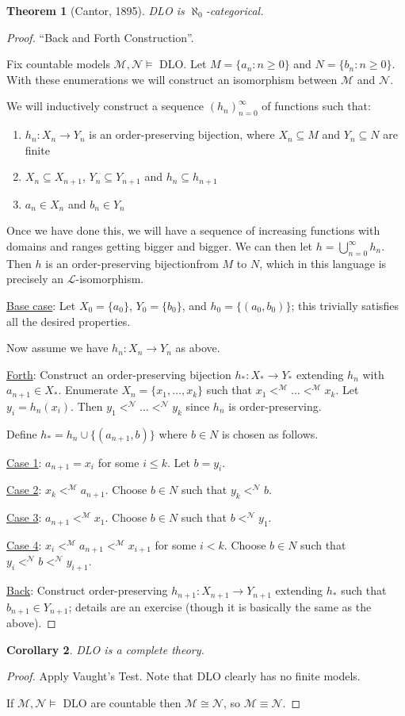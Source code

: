 \documentclass[]{article}
\theoremstyle{custhm}
\newtheorem{theorem}{Theorem}[section]
\theoremstyle{cusdef}
\theoremstyle{custhm}
\theoremstyle{custhm}
\newtheorem{cor}[theorem]{Corollary}
\theoremstyle{custhm}
\theoremstyle{ex}
\theoremstyle{custhm}
\theoremstyle{cusdef}
\theoremstyle{remark}
\theoremstyle{remark}
\newcommand{\ra}{\rightarrow}
\renewcommand{\L}{\mathcal{L}}
\newcommand{\M}{\mathcal{M}}
\newcommand{\N}{\mathcal{N}}
\renewcommand{\subset}{\subseteq}
\begin{document}
\begin{theorem}[Cantor, 1895]
DLO is $\aleph_0$-categorical.
\end{theorem}
\begin{proof}
``Back and Forth Construction''.

Fix countable models $\M,\N\models$ DLO. Let $M = \{a_n:n\ge 0\}$ and $N = \{b_n:n\ge 0\}$. With these enumerations we will construct an isomorphism between $\M$ and $\N$.

We will inductively construct a sequence $(h_n)_{n=0}^{\infty}$ of functions such that:
\begin{enumerate}[label=\arabic*)]
	\item $h_n:X_n\ra Y_n$ is an order-preserving bijection, where $X_n\subset M$ and $Y_n\subset N$ are finite
	\item $X_n\subset X_{n+1}$, $Y_n\subset Y_{n+1}$ and $h_n\subset h_{n+1}$
	\item $a_n \in X_n$ and $b_n \in Y_n$
\end{enumerate}
Once we have done this, we will have a sequence of increasing functions with domains and ranges getting bigger and bigger. We can then let $h = \bigcup_{n=0}^{\infty}h_n$. Then $h$ is an order-preserving bijectionfrom $M$ to $N$, which in this language is precisely an $\L$-isomorphism.

\underline{Base case}: Let $X_0 = \{a_0\}$, $Y_0 = \{b_0\}$, and $h_0 = \{(a_0,b_0)\}$; this trivially satisfies all the desired properties.

Now assume we have $h_n:X_n\ra Y_n$ as above.

\underline{Forth}: Construct an order-preserving bijection $h_\ast:X_\ast\ra Y_\ast$ extending $h_n$ with $a_{n+1}\in X_\ast$. Enumerate $X_n = \{x_1,\dots,x_k\}$ such that $x_1 <^\M \dots <^\M x_k$. Let $y_i = h_n(x_i)$. Then $y_1 <^\N \dots <^\N y_k$ since $h_n$ is order-preserving.

Define $h_\ast = h_n \cup \{(a_{n+1},b)\}$ where $b\in N$ is chosen as follows.

\underline{Case 1}: $a_{n+1} = x_i$ for some $i\le k$. Let $b = y_i$.

\underline{Case 2}: $x_k <^\M a_{n+1}$. Choose $b\in N$ such that $y_k <^\N b$.

\underline{Case 3}: $a_{n+1} <^\M x_1$. Choose $b\in N$ such that $b <^\N y_1$.

\underline{Case 4}: $x_i <^\M a_{n+1} <^\M x_{i+1}$ for some $ i < k$. Choose $b \in N$ such that $y_i < ^\N b < ^\N y_{i+1}$.

\underline{Back}: Construct order-preserving $h_{n+1}:X_{n+1}\ra Y_{n+1}$ extending $h_\ast$ such that $b_{n+1}\in Y_{n+1}$; details are an exercise (though it is basically the same as the above).
\end{proof}
\begin{cor}
DLO is a complete theory.
\end{cor}
\begin{proof}
Apply Vaught's Test. Note that DLO clearly has no finite models.

If $\M,\N\models$ DLO are countable then $\M \cong \N$, so $\M \equiv \N$.
\end{proof}
\end{document}

